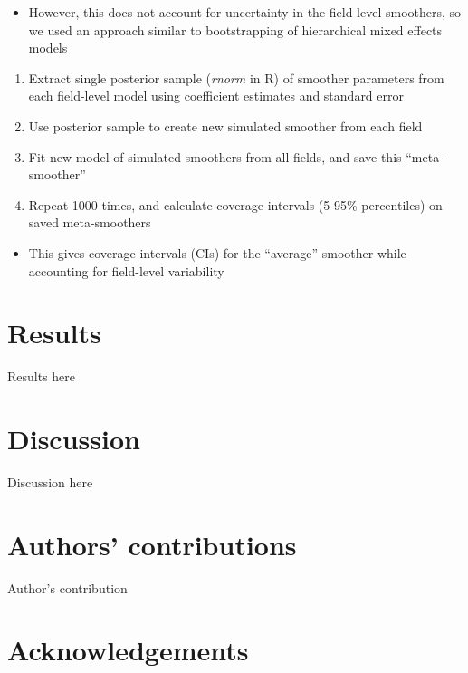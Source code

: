 \documentclass[]{elsarticle} %
\providecommand{\tightlist}{%
  \setlength{\itemsep}{0pt}\setlength{\parskip}{0pt}}
\begin{document}
\begin{itemize}
  \begin{itemize}
  \tightlist
  \item
    However, this does not account for uncertainty in the field-level smoothers, so we used an approach similar to bootstrapping of hierarchical mixed effects models
  \end{itemize}

  \begin{enumerate}
  \def\labelenumi{\arabic{enumi}.}
  \tightlist
  \item
    Extract single posterior sample (\emph{rnorm} in R) of smoother parameters from each field-level model using coefficient estimates and standard error
  \item
    Use posterior sample to create new simulated smoother from each field
  \item
    Fit new model of simulated smoothers from all fields, and save this ``meta-smoother''
  \item
    Repeat 1000 times, and calculate coverage intervals (5-95\% percentiles) on saved meta-smoothers
  \end{enumerate}

  \begin{itemize}
  \tightlist
  \item
    This gives coverage intervals (CIs) for the ``average'' smoother while accounting for field-level variability
  \end{itemize}
\end{itemize}

\hypertarget{results}{%
\section{Results}\label{results}}

Results here

\hypertarget{discussion}{%
\section{Discussion}\label{discussion}}

Discussion here

\hypertarget{authors-contributions}{%
\section{Authors' contributions}\label{authors-contributions}}

Author's contribution

\hypertarget{acknowledgements}{%
\section{Acknowledgements}\label{acknowledgements}}
\end{document}

